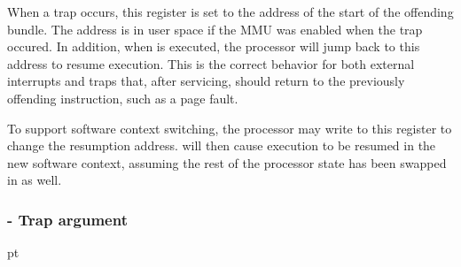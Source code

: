 \normalsize\vskip 6pt
\noindent When a trap occurs, this register is set to the address of the start of the
offending bundle. The address is in user space if the MMU was enabled when the
trap occured. In addition, when  is executed, the processor will jump
back to this address to resume execution. This is the correct behavior for both
external interrupts and traps that, after servicing, should return to the
previously offending instruction, such as a page fault.

To support software context switching, the processor may write to this register
to change the resumption address.  will then cause execution to be
resumed in the new software context, assuming the rest of the processor state
has been swapped in as well.
\subsubsection{ - Trap argument}
\label{reg:TA}
\label{reg:TA}
 pt\relax\noindent\footnotesize
